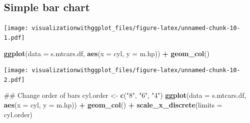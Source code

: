 \documentclass[]{krantz}
\makeatletter
\newenvironment{Shaded}{\begin{snugshade}}{\end{snugshade}}
\newcommand{\KeywordTok}[1]{\textcolor[rgb]{0.13,0.29,0.53}{\textbf{#1}}}
\newcommand{\DataTypeTok}[1]{\textcolor[rgb]{0.13,0.29,0.53}{#1}}
\newcommand{\DecValTok}[1]{\textcolor[rgb]{0.00,0.00,0.81}{#1}}
\newcommand{\StringTok}[1]{\textcolor[rgb]{0.31,0.60,0.02}{#1}}
\newcommand{\OperatorTok}[1]{\textcolor[rgb]{0.81,0.36,0.00}{\textbf{#1}}}
\newcommand{\NormalTok}[1]{#1}
\newenvironment{kframe}{%
\medskip{}
\setlength{\fboxsep}{.8em}
 \def\at@end@of@kframe{}%
 \ifinner\ifhmode%
  \def\at@end@of@kframe{\end{minipage}}%
  \begin{minipage}{\columnwidth}%
 \fi\fi%
 \def\FrameCommand##1{\hskip\@totalleftmargin \hskip-\fboxsep
 \colorbox{shadecolor}{##1}\hskip-\fboxsep
     \hskip-\linewidth \hskip-\@totalleftmargin \hskip\columnwidth}%
 \MakeFramed {\advance\hsize-\width
   \@totalleftmargin\z@ \linewidth\hsize
   \@setminipage}}%
 {\par\unskip\endMakeFramed%
 \at@end@of@kframe}
\renewenvironment{Shaded}{\begin{kframe}}{\end{kframe}}
\theoremstyle{definition}
\theoremstyle{definition}
\theoremstyle{definition}
\theoremstyle{remark}
\makeatother
\begin{document}
\subsection{Simple bar chart}\label{simple-bar-chart}

\begin{Shaded}
\end{Shaded}

\texttt{[image: visualizationwithggplot\_files/figure-latex/unnamed-chunk-10-1.pdf]}

\begin{Shaded}
\begin{Highlighting}[]
\KeywordTok{ggplot}\NormalTok{(}\DataTypeTok{data =}\NormalTok{ s.mtcars.df, }\KeywordTok{aes}\NormalTok{(}\DataTypeTok{x =}\NormalTok{ cyl, }\DataTypeTok{y =}\NormalTok{ m.hp)) }\OperatorTok{+}
\StringTok{  }\KeywordTok{geom_col}\NormalTok{()}
\end{Highlighting}
\end{Shaded}

\texttt{[image: visualizationwithggplot\_files/figure-latex/unnamed-chunk-10-2.pdf]}

\begin{Shaded}
\begin{Highlighting}[]
\NormalTok{## Change order of bars}
\NormalTok{cyl.order <-}\StringTok{ }\KeywordTok{c}\NormalTok{(}\StringTok{"8"}\NormalTok{, }\StringTok{"6"}\NormalTok{, }\StringTok{"4"}\NormalTok{)}
\KeywordTok{ggplot}\NormalTok{(}\DataTypeTok{data =}\NormalTok{ s.mtcars.df, }\KeywordTok{aes}\NormalTok{(}\DataTypeTok{x =}\NormalTok{ cyl, }\DataTypeTok{y =}\NormalTok{ m.hp)) }\OperatorTok{+}
\StringTok{  }\KeywordTok{geom_col}\NormalTok{() }\OperatorTok{+}
\StringTok{  }\KeywordTok{scale_x_discrete}\NormalTok{(}\DataTypeTok{limits =}\NormalTok{ cyl.order)}
\end{Highlighting}
\end{Shaded}
\end{document}
